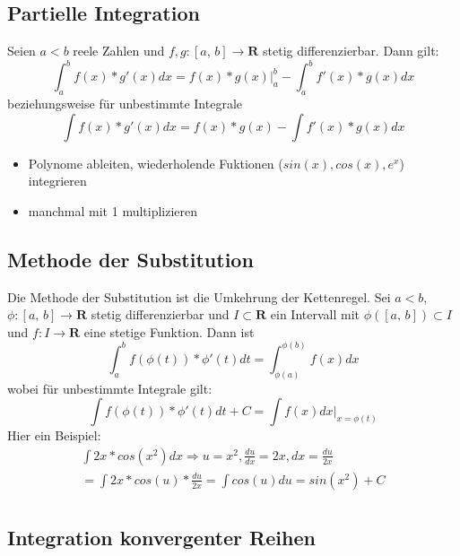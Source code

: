 \documentclass[8pt]{article}
\begin{document}
\begin{multicols*}{3}

\subsection{Partielle Integration}

Seien $a < b$ reele Zahlen und $f,g:[a,\,b] \rightarrow \mathbf{R}$ stetig differenzierbar.
Dann gilt:
$$
  \int_a^b f(x) * g'(x) dx = f(x) * g(x) \Big|_a^b - \int_a^b f'(x) * g(x) dx
$$
beziehungsweise für unbestimmte Integrale
$$
\int f(x) * g'(x) dx = f(x) * g(x) - \int f'(x) * g(x) dx
$$

\begin{itemize}
\item Polynome ableiten, wiederholende Fuktionen ($sin(x), cos(x), e^x$) integrieren
\item manchmal mit 1 multiplizieren
\end{itemize}

\subsection{Methode der Substitution}

Die Methode der Substitution ist die Umkehrung der Kettenregel. Sei $a < b$, $\phi:[a,\,b] \rightarrow \mathbf{R}$
stetig differenzierbar und $I \subset \mathbf{R}$ ein Intervall mit $\phi([a,\,b]) \subset I$ und $f: I \rightarrow \mathbf{R}$ eine stetige Funktion.
Dann ist
$$
  \int_a^b f(\phi(t)) * \phi'(t) dt = \int_{\phi(a)}^{\phi(b)} f(x) dx
$$
wobei für unbestimmte Integrale gilt:
$$
  \int f(\phi(t)) * \phi'(t) dt + C = \int f(x) dx \Big|_{x = \phi(t)}
$$
Hier ein Beispiel:
\begin{align*}
  \int 2x * cos(x^2) dx \Rightarrow u = x^2, \frac{du}{dx} = 2x, dx = \frac{du}{2x}\\
  = \int 2x * cos(u) * \frac{du}{2x} = \int cos(u) du = sin(x^2) + C\\
\end{align*}

\subsection{Integration konvergenter Reihen}


\end{multicols*}
\end{document}
